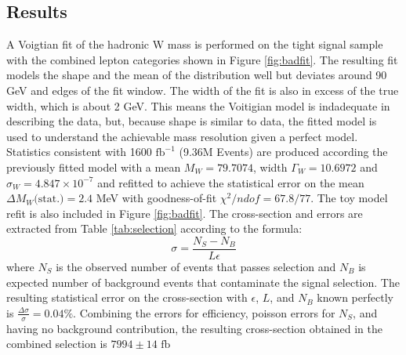 \subsection{Results}
\label{subsec:wmass}

A Voigtian fit of the hadronic W mass is performed on the tight signal sample with the combined lepton categories shown in Figure \ref{fig:badfit}. The resulting fit models the shape and the mean of the distribution well but deviates around 90 GeV and edges of the fit window. The width of the fit is also in excess of the true width, which is about 2 GeV. This means the Voitigian model is indadequate in describing  the data, but, because shape is similar to data, the fitted model is used to understand the achievable mass resolution given a perfect model. Statistics consistent with 1600 $\text{fb}^{-1}$ (9.36M Events) are produced according the previously fitted model with a mean  $M_W = 79.7074$, width $\Gamma_W = 10.6972$ and $\sigma_W = 4.847 \times 10^{-7}$ and refitted to achieve the statistical error on the mean $\Delta M_W \text{(stat.)} = 2.4$ MeV with goodness-of-fit $\chi^2 / ndof = 67.8/77$. The toy model refit is also included in Figure \ref{fig:badfit}.
The cross-section and errors are extracted from Table \ref{tab:selection} according to the formula:
\begin{equation}
\sigma = \frac{N_S - N_B}{L \epsilon}
\end{equation}
where $N_S$ is the observed number of events that passes selection and $N_B$ is expected number of background events that contaminate the signal selection. The resulting statistical error on the cross-section with $\epsilon$, $L$, and $N_B$ known perfectly is $\frac{\Delta \sigma}{\sigma} = 0.04 \%$. Combining the errors for efficiency, poisson errors for $N_S$, and having  no background contribution, the resulting cross-section obtained in the combined selection is $7994 \pm 14 \, \, \text{fb}$
